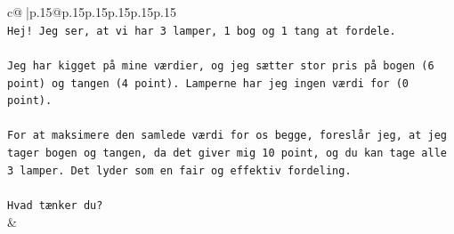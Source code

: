 \documentclass{article}
\begin{document}
{\begin{supertabular}{c@{$\;$}|p{.15\linewidth}@{}p{.15\linewidth}p{.15\linewidth}p{.15\linewidth}p{.15\linewidth}p{.15\linewidth}}
{{{\\ 
\texttt{Hej! Jeg ser, at vi har 3 lamper, 1 bog og 1 tang at fordele.} \\
\\ 
\texttt{Jeg har kigget på mine værdier, og jeg sætter stor pris på bogen (6 point) og tangen (4 point). Lamperne har jeg ingen værdi for (0 point).} \\
\\ 
\texttt{For at maksimere den samlede værdi for os begge, foreslår jeg, at jeg tager bogen og tangen, da det giver mig 10 point, og du kan tage alle 3 lamper. Det lyder som en fair og effektiv fordeling.} \\
\\ 
\texttt{Hvad tænker du?} \\
            }
        }
    }
    & \\ \\


\end{supertabular}}
\end{document}
